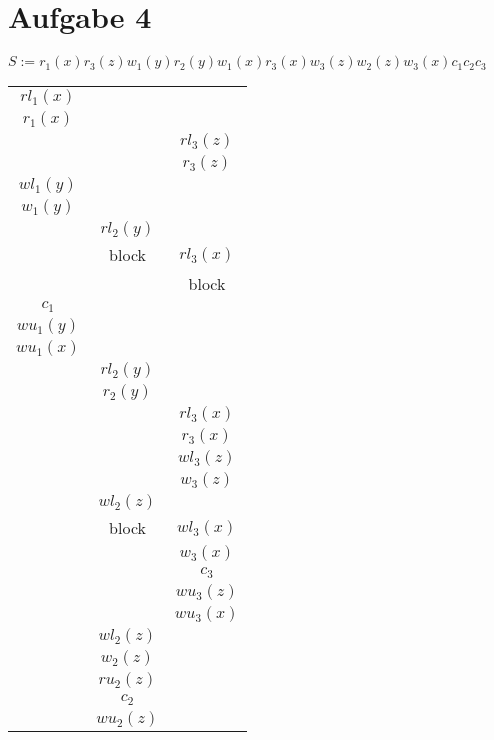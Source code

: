 \documentclass{scrartcl}
\begin{document}
\section*{Aufgabe 4}
$S := r_1(x)r_3(z)w_1(y)r_2(y)w_1(x)r_3(x)w_3(z)w_2(z)w_3(x)c_1c_2c_3$\\
\begin{tabular}{|c|c|c|}
\hline
 $rl_1(x)$ & &  \\ 
 $r_1(x)$ & &  \\ 
  & & $rl_3(z)$ \\   
  & & $r_3(z)$ \\ 
 $wl_1(y)$ & &  \\ 
 $w_1(y)$ & &  \\  
  & $rl_2(y)$ & \\ 
  & block & $rl_3(x)$ \\ 
  &  & block \\ 
 $c_1$ &  &  \\ 
 $wu_1(y)$ &  &  \\ 
 $wu_1(x)$ &  &  \\ 
  & $rl_2(y)$ &  \\ 
  & $r_2(y)$ &  \\ 
  &  & $rl_3(x)$ \\ 
  &  & $r_3(x)$ \\ 
  &  & $wl_3(z)$ \\ 
  &  & $w_3(z)$ \\ 
  & $wl_2(z)$ &  \\ 
  & block & $wl_3(x)$ \\ 
  &  & $w_3(x)$ \\ 
  &  & $c_3$ \\ 
  &  & $wu_3(z)$ \\ 
  &  & $wu_3(x)$ \\ 
  & $wl_2(z)$ &  \\
  & $w_2(z)$ &  \\ 
  & $ru_2(z)$ &  \\
  & $c_2$ &  \\ 
  & $wu_2(z)$ &  \\
  \hline   
\end{tabular} 
\end{document}
